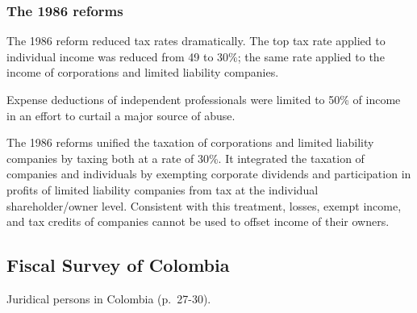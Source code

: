 \documentclass[
  12pt]{article}
\theoremstyle{definition}
\theoremstyle{remark}
\begin{document}
\subsubsection{The 1986 reforms}\label{the-1986-reforms}

The 1986 reform reduced tax rates dramatically. The top tax rate applied
to individual income was reduced from 49 to 30\%; the same rate applied
to the income of corporations and limited liability companies.

Expense deductions of independent professionals were limited to 50\% of
income in an effort to curtail a major source of abuse.

The 1986 reforms unified the taxation of corporations and limited
liability companies by taxing both at a rate of 30\%. It integrated the
taxation of companies and individuals by exempting corporate dividends
and participation in profits of limited liability companies from tax at
the individual shareholder/owner level. Consistent with this treatment,
losses, exempt income, and tax credits of companies cannot be used to
offset income of their owners.

\subsection{Fiscal Survey of Colombia}\label{fiscal-survey-of-colombia}

Juridical persons in Colombia (p.~27-30).
\end{document}
